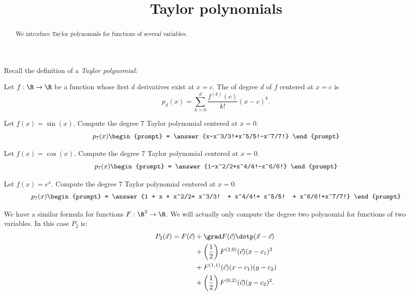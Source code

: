 \documentclass{ximera}
\title[Dig-In:]{Taylor polynomials}
\begin{document}
\begin{abstract}
  We introduce Taylor polynomials for functions of several variables.
\end{abstract}
\maketitle


Recall the definition of a \textit{Taylor polynomial}:

\begin{definition}
  Let $f:\R\to\R$ be a function whose first $d$ derivatives exist at $x=c$.
  The  of degree $d$ of $f$ centered at $x=c$ is
  \[
  p_d(x) = \sum_{k=0}^d\frac{f^{(k)}(c)}{k!}(x-c)^k.
  \]
\end{definition}

\begin{question}
  Let $f(x) = \sin(x)$. Compute the degree $7$ Taylor polynomial
  centered at $x=0$.
  \[
  p_7(x)\begin{prompt}
    = \answer{x-x^3/3!+x^5/5!-x^7/7!}
  \end{prompt}
  \]
  \begin{question}
  Let $f(x) = \cos(x)$. Compute the degree $7$ Taylor polynomial
  centered at $x=0$.
  \[
  p_7(x)\begin{prompt}
    = \answer{1-x^2/2+x^4/4!-x^6/6!}
  \end{prompt}
  \]
  \begin{question}
    Let $f(x) = e^x$. Compute the degree $7$ Taylor polynomial
  centered at $x=0$.
    \[
    p_7(x)\begin{prompt}
      = \answer{1 + x + x^2/2+ x^3/3! + x^4/4!+ x^5/5! + x^6/6!+x^7/7!}
    \end{prompt}
    \]
  \end{question}
\end{question}
\end{question}

We have a similar formula for functions $F:\R^2\to \R$.
We will actually only compute the degree two polynomial for functions
of two variables. In this case $P_2$ is:
\begin{align*}
P_2(\vec{x})=F(\vec{c})
&+ \grad F(\vec{c})\dotp (\vec{x}-\vec{c})\\
&+\left(\frac{1}{2}\right)F^{(2,0)}(\vec{c}) (x-c_1)^2 \\
&+ F^{(1,1)}(\vec{c})(x-c_1)(y-c_2) \\
&+ \left(\frac{1}{2}\right)F^{(0,2)}(\vec{c})(y-c_2)^2.
\end{align*}
\end{document}
